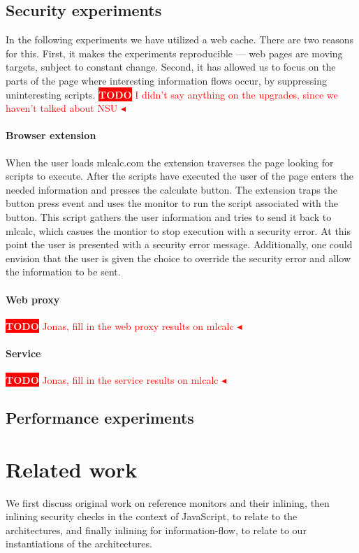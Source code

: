 \documentclass{llncs}
\newcommand{\todo}[1]{\colorbox{red}{\textcolor{white}{\sffamily\bfseries\scriptsize TODO}} \textcolor{red}{#1} \textcolor{red}{$\blacktriangleleft$}}
\begin{document}
\subsection{Security experiments}
In the following experiments we have utilized a web cache. There are two
reasons for this. First, it makes the experiments reproducible --- web pages 
are moving targets, subject to constant change. Second, it has allowed us
to focus on the parts of the page where interesting information flows occur,
by suppressing uninteresting scripts.
\todo{I didn't say anything on the upgrades, since we haven't talked about NSU}

\paragraph{Browser extension}
When the user loads mlcalc.com the extension traverses the page looking for
scripts to execute. After the scripts have executed the user of the page
enters the needed information and presses the calculate button. The extension
traps the button press event and uses the monitor to run the script associated
with the button. This script gathers the user information and tries to send
it back to mlcalc, which casues the montior to stop execution with a security 
error. At this point the user is presented with a security error message. 
Additionally, one could envision that the user is given the choice to
override the security error and allow the information to be sent.


\paragraph{Web proxy}

\todo{Jonas, fill in the web proxy results on mlcalc}


\paragraph{Service}

\todo{Jonas, fill in the service results on mlcalc}


\subsection{Performance experiments}

\section{Related work}
\label{sec:related}
We first discuss original work on reference monitors and their
inlining, then
inlining security checks in the context of
JavaScript, to relate to the architectures, 
and finally inlining for information-flow, to relate to our instantiations
of the architectures.
\end{document}

